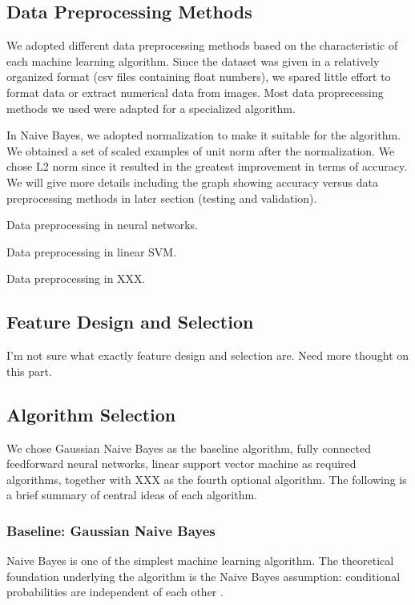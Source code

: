 \documentclass{acm_proc_article-sp}
\begin{document}
\subsection{Data Preprocessing Methods}
We adopted different data preprocessing methods based on the characteristic of each machine learning algorithm. Since the dataset was given in a relatively organized format (csv files containing float numbers), we spared little effort to format data or extract numerical data from images. Most data proprecessing methods we used were adapted for a specialized algorithm.

In Naive Bayes, we adopted normalization to  make it suitable for the algorithm. We obtained a set of scaled examples of unit norm after the normalization. We chose L2 norm since it resulted in the greatest improvement in terms of accuracy. We will give more details including the graph showing accuracy versus data preprocessing methods in later section (testing and validation).

Data preprocessing in neural networks. 

Data preprocessing in linear SVM.

Data preprocessing in XXX.

\subsection{Feature Design and Selection}
I'm not sure what exactly feature design and selection are. Need more thought on this part.

\subsection{Algorithm Selection}
We chose Gaussian Naive Bayes as the baseline algorithm, fully connected feedforward neural networks, linear support vector machine as required algorithms, together with XXX as the fourth optional algorithm. The following is a brief summary of central ideas of each algorithm.

\subsubsection{Baseline: Gaussian Naive Bayes}
Naive Bayes is one of the simplest machine learning algorithm. The theoretical foundation underlying the algorithm is the Naive Bayes assumption: conditional probabilities are independent of each other \cite{Bishop:2006:PRM:1162264, pineaul5}.
\end{document}
